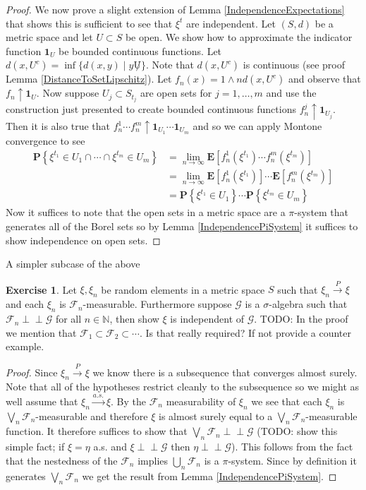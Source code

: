 \documentclass{amsbook}
\theoremstyle{definition}
\newtheorem{xca}{Exercise}
\theoremstyle{remark}
\newcommand{\Independent}{\perp \! \! \! \perp}
\newcommand{\expectation}[1]{\textbf{E}\left[#1\right]}
\newcommand{\probability}[1]{\textbf{P}\left \{#1 \right \}}
\newcommand{\characteristic}[1]{\textbf{1}_{#1}}
\newcommand{\naturals}{\mathbb{N}}
\newcommand{\toprob}{\overset{P}\to}
\newcommand{\toas}{\overset{a.s.}\to}
\begin{document}
\begin{proof}
We now prove a slight extension of Lemma
\ref{IndependenceExpectations} that shows this is sufficient to see
that $\xi^t$ are independent.  Let $(S,d)$ be a metric space and let
$U \subset S$ be open.  We show how to approximate the indicator
function $\characteristic{U}$ be bounded continuous functions.  Let
$d(x, U^c) = \inf \lbrace d(x,y) \mid y \not U \rbrace$.  Note that
$d(x, U^c)$ is continuous (see proof Lemma
\ref{DistanceToSetLipschitz}).  Let $f_n(x) = 1 \wedge n d(x, U^c)$
and observe that $f_n \uparrow \characteristic{U}$.  Now suppose
$U_{j} \subset S_{t_j}$ are open sets for $j=1, \dotsc,m$ and use the
construction just presented to create bounded continuous functions
$f^j_n \uparrow \characteristic{U_j}$.  Then it is also true that
$f^1_n \dotsm f^m_n \uparrow \characteristic{U_1} \dotsm
\characteristic{U_m}$ and so we can apply Montone convergence to see 
\begin{align*}
\probability{\xi^{t_1} \in U_1 \cap \dotsb \cap \xi^{t_m} \in U_m} &=
\lim_{n \to \infty} \expectation{f^1_n(\xi^{t_1}) \dotsm
f^m_n(\xi^{t_m})} \\
&= \lim_{n \to \infty} \expectation{f^1_n(\xi^{t_1}) } \dotsm
\expectation{f^m_n(\xi^{t_m})} \\
&= \probability{\xi^{t_1} \in U_1} \dotsm\probability{\xi^{t_m} \in
  U_m} 
\end{align*}
Now it suffices to note that the open sets  in a metric space are a
$\pi$-system that generates all of the Borel sets so by Lemma
\ref{IndependencePiSystem} it suffices to
show independence on open sets.
\end{proof}

A simpler subcase of the above
\begin{xca}Let $\xi, \xi_n$ be random elements in a metric space $S$
  such that $\xi_n \toprob \xi$ and each $\xi_n$ is
  $\mathcal{F}_n$-measurable.  Furthermore suppose $\mathcal{G}$ is a
  $\sigma$-algebra such that $\mathcal{F}_n \Independent \mathcal{G}$
  for all $n \in \naturals$, then show $\xi$ is independent of
  $\mathcal{G}$.
TODO: In the proof we mention that $\mathcal{F}_1 \subset
\mathcal{F}_2 \subset \cdots$.  Is that really required?  If not
provide a counter example.
\end{xca}
\begin{proof}
Since $\xi_n \toprob \xi$ we know there is a subsequence  that
converges almost surely.  Note that all of the hypotheses restrict
cleanly to the subsequence so we might as well assume that $\xi_n
\toas \xi$.  By the $\mathcal{F}_n$ measurability of $\xi_n$ we see
that each $\xi_n$ is $\bigvee_n \mathcal{F}_n$-measurable and
therefore $\xi$ is almost surely equal to a $\bigvee_n
\mathcal{F}_n$-measurable function.  It therefore suffices to show
that $\bigvee_n
\mathcal{F}_n \Independent \mathcal{G}$ (TODO: show this simple fact; if $\xi
= \eta$ a.s. and $\xi \Independent \mathcal{G}$ then $\eta \Independent
\mathcal{G}$).  This follows from the fact
that the nestedness of the $\mathcal{F}_n$ implies $\bigcup_n
\mathcal{F}_n$ is a $\pi$-system.  Since by definition it generates $\bigvee_n
\mathcal{F}_n$ we get the result from Lemma \ref{IndependencePiSystem}.
\end{proof}
\end{document}
